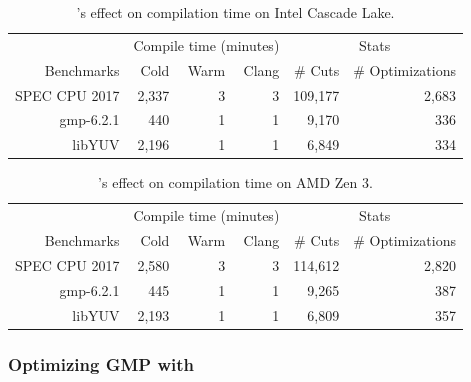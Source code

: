 \begin{table}[t]
  \centering
  \caption{\minotaur's effect on compilation time on Intel Cascade Lake.}
  \begin{tabular}{r | r r r | r r }
    \toprule
    & \multicolumn{3}{c|}{Compile time (minutes)} & \multicolumn{2}{c}{Stats} \\
    Benchmarks & Cold & Warm & Clang & \# Cuts & \# Optimizations \\
    \hline
    SPEC CPU 2017 & 2,337 & 3 & 3 & 109,177 & 2,683  \\
    gmp-6.2.1 & 440 &  1 &  1 & 9,170 & 336 \\
    libYUV & 2,196 &  1 &  1 & 6,849 & 334  \\
    \bottomrule
  \end{tabular}
  \label{tab:compiletimeintel}
\end{table}

\begin{table}[t]
  \centering
  \caption{\minotaur's effect on compilation time on AMD Zen 3.}
  \begin{tabular}{r | r r r | r r}
    \toprule

    & \multicolumn{3}{c|}{Compile time (minutes)} & \multicolumn{2}{c}{Stats} \\
    Benchmarks & Cold & Warm & Clang & \# Cuts & \# Optimizations \\
    \hline
    SPEC CPU 2017 & 2,580 & 3 & 3 & 114,612 & 2,820 \\
    gmp-6.2.1 &  445 & 1 & 1 & 9,265 & 387\\
    libYUV  & 2,193 & 1 & 1 & 6,809 & 357 \\
    \bottomrule
  \end{tabular}
  \label{tab:compiletimeamd}
\end{table}


\subsubsection{Optimizing GMP with \minotaur{}}

